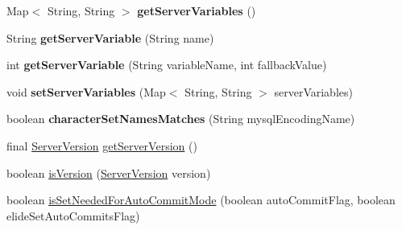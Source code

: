 \begin{DoxyCompactItemize}
Map$<$ String, String $>$ {\bfseries get\+Server\+Variables} ()
\item 
\mbox{\label{classcom_1_1mysql_1_1cj_1_1protocol_1_1a_1_1_native_server_session_ac4c00989ffc6de351aa574fb6cc4a24b}} 
String {\bfseries get\+Server\+Variable} (String name)
\item 
\mbox{\label{classcom_1_1mysql_1_1cj_1_1protocol_1_1a_1_1_native_server_session_a1073d8d9d87cbae4427770f6a33825f5}} 
int {\bfseries get\+Server\+Variable} (String variable\+Name, int fallback\+Value)
\item 
\mbox{\label{classcom_1_1mysql_1_1cj_1_1protocol_1_1a_1_1_native_server_session_a5075caf877a67ffac4ab458c54f56071}} 
void {\bfseries set\+Server\+Variables} (Map$<$ String, String $>$ server\+Variables)
\item 
\mbox{\label{classcom_1_1mysql_1_1cj_1_1protocol_1_1a_1_1_native_server_session_a36b26698c0ac9c2f0935c2173e11297b}} 
boolean {\bfseries character\+Set\+Names\+Matches} (String mysql\+Encoding\+Name)
\item 
final \mbox{\hyperlink{classcom_1_1mysql_1_1cj_1_1_server_version}{Server\+Version}} \mbox{\hyperlink{classcom_1_1mysql_1_1cj_1_1protocol_1_1a_1_1_native_server_session_a38d2e0173e10f1f3b55a04c34c9fa8e8}{get\+Server\+Version}} ()
\item 
boolean \mbox{\hyperlink{classcom_1_1mysql_1_1cj_1_1protocol_1_1a_1_1_native_server_session_a07301eeaa6402981ce961f528b4e09ef}{is\+Version}} (\mbox{\hyperlink{classcom_1_1mysql_1_1cj_1_1_server_version}{Server\+Version}} version)
\item 
boolean \mbox{\hyperlink{classcom_1_1mysql_1_1cj_1_1protocol_1_1a_1_1_native_server_session_a4d7271374accd773d7db0f8858d479e7}{is\+Set\+Needed\+For\+Auto\+Commit\+Mode}} (boolean auto\+Commit\+Flag, boolean elide\+Set\+Auto\+Commits\+Flag)
\item 
\mbox{\label{classcom_1_1mysql_1_1cj_1_1protocol_1_1a_1_1_native_server_session_aea6f38295ee9c65cfc59d975b20539ff}} 

\end{DoxyCompactItemize}
